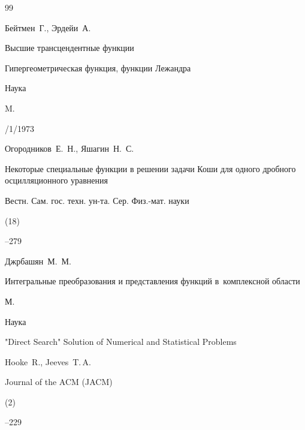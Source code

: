 \documentclass[11pt,a4paper,twoside]{article}
\begin{document}
\begin{thebibliography}{99}


\by Бейтмен~Г., Эрдейи~А.


\book Высшие трансцендентные функции




\voltitle Гипергеометрическая функция, функции Лежандра




\publ Наука


\publaddr M.


/1/1973









\by Огородников~Е.~Н., Яшагин~Н.~С.


\paper Некоторые специальные функции в решении задачи Коши для одного дробного осцилляционного уравнения


\jour Вестн. Сам. гос. техн. ун-та. Сер. Физ.-мат. науки




(18)


--279











\by Джрбашян~М.~М.


\book Интегральные преобразования и представления функций в~комплексной области


\publaddr М.


\publ Наука













\paper  "Direct Search" Solution of Numerical and Statistical Problems


\by Hooke~R.,  Jeeves~T.\,A. 


\jour Journal of the ACM (JACM)


(2)




--229













\end{thebibliography}
\end{document}
